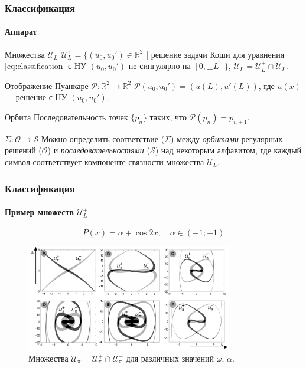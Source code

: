 \documentclass [10pt] {beamer}
\begin{document}
\begin{frame}
	\frametitle{Классификация}
	\framesubtitle{Аппарат}

	\begin{block}{Множества $\mathscr{U}_L^{\pm}$}
	$\mathscr{U}_L^{\pm} = \{ (u_0, u_0') \in \mathbb{R}^2$ | решение задачи Коши для уравнения \eqref{eq:classification} с НУ $(u_0, u_0')$ не сингулярно на $[0, {\pm} L] \}$, $\mathscr{U}_L = \mathscr{U}_L^+ \cap \mathscr{U}_L^-$.
	\end{block}

	\begin{block}{Отображение Пуанкаре $\mathcal{P}: \mathbb{R}^2 \to \mathbb{R}^2$}
		$\mathcal{P} (u_0,u_0') = (u(L), u'(L))$, где $u(x)$ --- решение с НУ $(u_0, u_0')$.
	\end{block}

	\begin{block}{Орбита}
		Последовательность точек $\{ p_n \}$ таких, что $\mathcal{P}(p_n) = p_{n+1}$.
	\end{block}

	\begin{block}{$\Sigma: \mathcal{O} \to \mathcal{S}$}
		Можно определить соответствие ($\Sigma$) между {\it орбитами} регулярных решений ($\mathcal{O}$) и {\it последовательностями} ($\mathcal{S}$) над некоторым алфавитом, где каждый символ соответствует компоненте связности множества $\mathscr{U}_L$.
	\end{block}
\end{frame}

\begin{frame}
	\frametitle{Классификация}
	\framesubtitle{Пример множеств $\mathscr{U}_L^{\pm}$}
	$$P(x) = \alpha + \cos{2x}, \quad \alpha \in (-1; +1)$$
	\begin{figure}
		\includegraphics[width=0.8\textwidth]{pic/sets.pdf}
		\caption{Множества $\mathscr{U}_{\pi} = \mathscr{U}_{\pi}^+ \cap \mathscr{U}_{\pi}^-$ для различных значений $\omega$, $\alpha$.}
		\label{pic:sets}
	\end{figure}
\end{frame}
\end{document}
